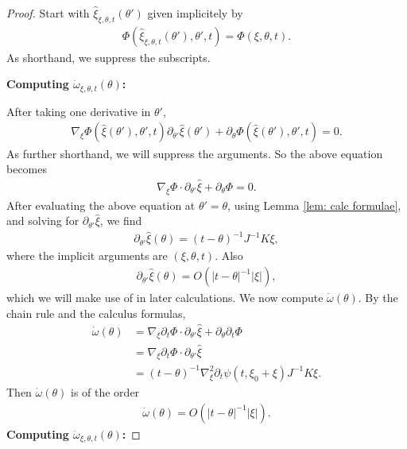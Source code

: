 \documentclass[12pt]{amsart}
\numberwithin{equation}{section}
\newcommand{\1}{\mathbbm{1}}
\newcommand{\xixi}{\xi_0 + \xi}
\begin{document}
\begin{proof}
    Start with $\hat \xi_{\xi,\theta, t}(\theta')$ given implicitely by 
    \begin{align}
        \Phi(\hat \xi_{\xi, \theta, t}(\theta'), \theta', t) = \Phi(\xi, \theta, t). 
    \end{align}
    As shorthand, we suppress the subscripts. 

    \medskip
    
    \noindent \textbf{Computing $\dot \omega_{\xi,\theta, t}(\theta)$: }
    
    After taking one derivative in $\theta'$, 
    \begin{align}
        \nabla_\xi \Phi(\hat \xi(\theta'), \theta', t) \partial_{\theta'}\hat \xi(\theta') + \partial_\theta \Phi(\hat \xi(\theta'), \theta', t)= 0. 
    \end{align}
    As further shorthand, we will suppress the arguments. So the above equation becomes 
    \begin{align}\label{eq: implicit one deriv}
        \nabla_\xi \Phi \cdot \partial_{\theta'} \hat \xi + \partial_\theta \Phi = 0. 
    \end{align}
    After evaluating the above equation at $\theta' = \theta$, using Lemma \ref{lem: calc formulae}, and solving for $\partial_{\theta'} \hat \xi$, we find 
    \begin{align}
        \partial_{\theta'} \hat \xi(\theta) = (t - \theta)^{-1} J^{-1} K \xi,
    \end{align}
    where the implicit arguments are $(\xi, \theta, t)$. Also 
    \begin{align}\label{eq: dot xi order}
        \partial_{\theta'} \hat \xi(\theta) = O(|t - \theta|^{-1} |\xi|),
    \end{align}
    which we will make use of in later calculations. 
    We now compute $\dot \omega(\theta)$. By the chain rule and the calculus formulas, 
    \begin{align}
        \dot \omega(\theta) &= \nabla_\xi \partial_t \Phi \cdot \partial_{\theta'} \hat \xi + \partial_\theta \partial_t \Phi \\
        &= \nabla_\xi \partial_t \Phi \cdot \partial_{\theta'} \hat \xi \\
        &= (t - \theta)^{-1} \nabla_\xi^2 \partial_t \psi(t, \xixi) J^{-1} K \xi.  
    \end{align}
    Then $\dot \omega(\theta)$ is of the order 
    \begin{align}\label{eq: ddot xi order}
        \dot \omega(\theta) = O(|t - \theta|^{-1} |\xi|). 
    \end{align}
    \noindent \textbf{Computing $\ddot \omega_{\xi, \theta, t}(\theta)$:}
    

\end{proof}
\end{document}
